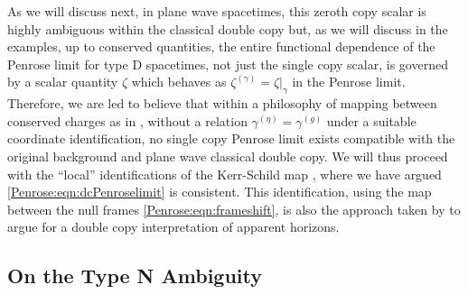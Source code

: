 As we will discuss next, in plane wave spacetimes, this zeroth copy scalar is highly ambiguous within the classical
double copy but, as we will discuss in the examples, up to conserved quantities, the entire functional dependence
of the Penrose limit for type D spacetimes, not just the single copy scalar, is governed by a scalar quantity
$\zeta$ which behaves as $\zeta^{(\gamma)} = \zeta|_{\gamma}$ in the Penrose limit. Therefore, we are led to
believe that within a philosophy of mapping between conserved charges as in \cite{Gonzo:2021drq,Ball:2023xnr},
without a relation $\gamma^{(\eta)} = \gamma^{(g)}$ under a suitable coordinate identification, no single copy
Penrose limit exists compatible with the original background and plane wave classical double copy. We will thus
proceed with the ``local'' identifications of the Kerr-Schild map \cite{Monteiro:2014cda}, where we have argued
\eqref{Penrose:eqn:dcPenroselimit} is consistent. This identification, using the map between the null frames
\eqref{Penrose:eqn:frameshift}, is also the approach taken by \cite{Chawla:2023bsu,He:2023iew} to argue
for a double copy interpretation of apparent horizons.  

\subsection{On the Type N Ambiguity}\label{Penrose:sec:ambiguity}

